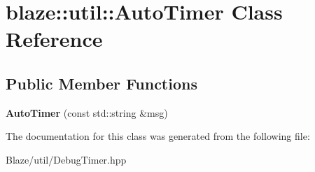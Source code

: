 \hypertarget{classblaze_1_1util_1_1AutoTimer}{}\section{blaze\+:\+:util\+:\+:Auto\+Timer Class Reference}
\label{classblaze_1_1util_1_1AutoTimer}
\subsection*{Public Member Functions}
\begin{DoxyCompactItemize}
\item 
\mbox{\label{classblaze_1_1util_1_1AutoTimer_ae8c4b739eac9a9ea39c1d6a092976967}} 
{\bfseries Auto\+Timer} (const std\+::string \&msg)
\end{DoxyCompactItemize}


The documentation for this class was generated from the following file\+:\begin{DoxyCompactItemize}
\item 
Blaze/util/Debug\+Timer.\+hpp\end{DoxyCompactItemize}
